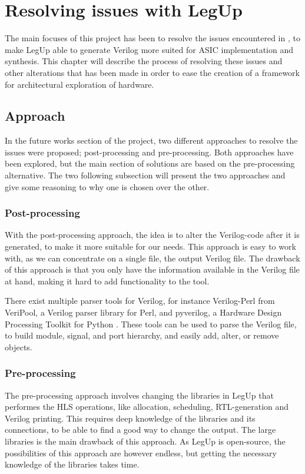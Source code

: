 \chapter{Resolving issues with LegUp}
The main focuses of this project has been to resolve the issues encountered in \cite{holm2015pro}, to make LegUp able to generate Verilog more suited for ASIC implementation and synthesis. This chapter will describe the process of resolving these issues and other alterations that has been made in order to ease the creation of a framework for architectural exploration of hardware.
\section{Approach}
In the future works section of the project, two different approaches to resolve the issues were proposed; post-processing and pre-processing. Both approaches have been explored, but the main section of solutions are based on the pre-processing alternative. The two following subsection will present the two approaches and give some reasoning to why one is chosen over the other.
\subsection{Post-processing}
With the post-processing approach, the idea is to alter the Verilog-code after it is generated, to make it more suitable for our needs. This approach is easy to work with, as we can concentrate on a single file, the output Verilog file. The drawback of this approach is that you only have the information available in the Verilog file at hand, making it hard to add functionality to the tool.

There exist multiple parser tools for Verilog, for instance Verilog-Perl from VeriPool, a Verilog parser library for Perl, and pyverilog, a Hardware Design Processing Toolkit for Python \cite{Takamaeda2015Pyverilog}. These tools can be used to parse the Verilog file, to build module, signal, and port hierarchy, and easily add, alter, or remove objects.
\subsection{Pre-processing}
The pre-processing approach involves changing the libraries in LegUp that performes the HLS operations, like allocation, scheduling, RTL-generation and Verilog printing. This requires deep knowledge of the libraries and its connections, to be able to find a good way to change the output. The large libraries is the main drawback of this approach. As LegUp is open-source, the possibilities of this approach are however endless, but getting the necessary knowledge of the libraries takes time.
